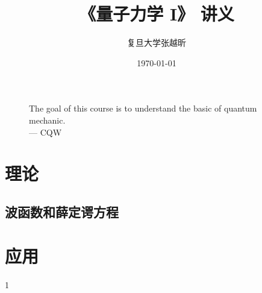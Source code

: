 \documentclass[UTF-8,heading=true,%
	zihao=-4,a4paper]{ctexbook}
\title{《量子力学 I》 讲义}
\author{\kaishu 复旦大学\quad 张越昕}
\date{\kaishu \today}
\begin{document}
\frontmatter
\maketitle
\begin{figure}
\centering
\huge The goal of this course is to understand the basic of quantum mechanic.\\
\raggedleft
\Large --- CQW
\end{figure}
\clearpage 
{}
\tableofcontents

\mainmatter
\part{理\qquad 论}
\chapter{波函数和薛定谔方程}



\part{应\qquad 用}
1
\end{document}
